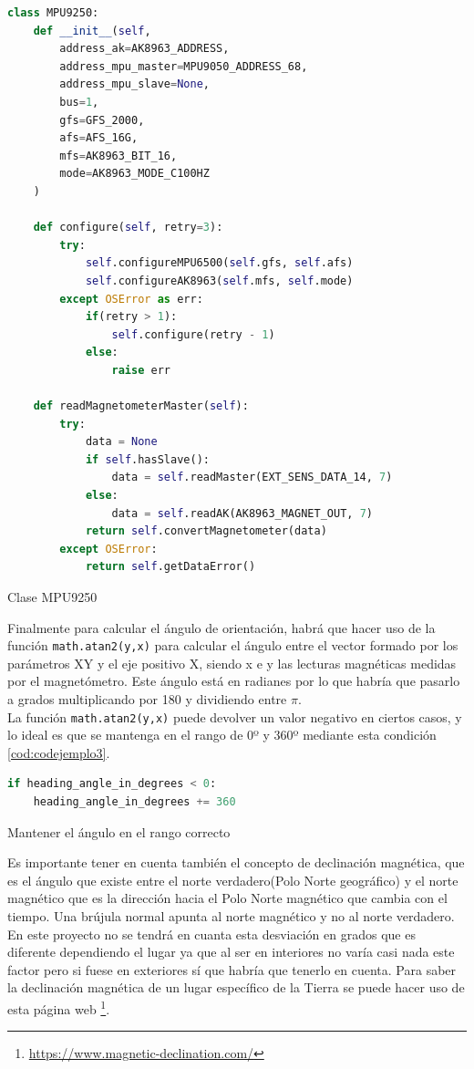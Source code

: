 \begin{code}[H]
\begin{lstlisting}[language=Python]
class MPU9250:
    def __init__(self, 
        address_ak=AK8963_ADDRESS, 
        address_mpu_master=MPU9050_ADDRESS_68, 
        address_mpu_slave=None, 
        bus=1, 
        gfs=GFS_2000, 
        afs=AFS_16G, 
        mfs=AK8963_BIT_16, 
        mode=AK8963_MODE_C100HZ
    )
       
    def configure(self, retry=3):
        try:
            self.configureMPU6500(self.gfs, self.afs)
            self.configureAK8963(self.mfs, self.mode)
        except OSError as err:
            if(retry > 1):
                self.configure(retry - 1)
            else:
                raise err
     
    def readMagnetometerMaster(self):
        try:
            data = None
            if self.hasSlave():
                data = self.readMaster(EXT_SENS_DATA_14, 7)          
            else:   
                data = self.readAK(AK8963_MAGNET_OUT, 7)
            return self.convertMagnetometer(data)
        except OSError:
            return self.getDataError()           
\end{lstlisting}
\caption[Clase MPU9250]{Clase MPU9250}
\label{cod:codejemplo}
\end{code}


Finalmente para calcular el ángulo de orientación, habrá que hacer uso de la función \verb|math.atan2(y,x)| para calcular el ángulo entre el vector formado por los parámetros XY y el eje positivo X, siendo x e y las lecturas magnéticas medidas por el magnetómetro. Este ángulo está en radianes por lo que habría que pasarlo a grados multiplicando por 180 y dividiendo entre \(\pi\).\\

La función \verb|math.atan2(y,x)| puede devolver un valor negativo en ciertos casos, y lo ideal es que se mantenga en el rango de 0º y 360º mediante esta condición \ref{cod:codejemplo3}.


\begin{code}[H]
\begin{lstlisting}[language=Python]
if heading_angle_in_degrees < 0:
    heading_angle_in_degrees += 360
\end{lstlisting}
\caption[Mantener el ángulo en el rango correcto]{Mantener el ángulo en el rango correcto}
\label{cod:codejemplo3}
\end{code}


Es importante tener en cuenta también el concepto de declinación magnética, que es el ángulo que existe entre el norte verdadero(Polo Norte geográfico) y el norte magnético que es la dirección hacia el Polo Norte magnético que cambia con el tiempo. Una brújula normal apunta al norte magnético y no al norte verdadero. En este proyecto no se tendrá en cuanta esta desviación en grados que es diferente dependiendo el lugar ya que al ser en interiores no varía casi nada este factor pero si fuese en exteriores sí que habría que tenerlo en cuenta. Para saber la declinación magnética de un lugar específico de la Tierra se puede hacer uso de esta página web \footnote{\url{https://www.magnetic-declination.com/}}.\\


